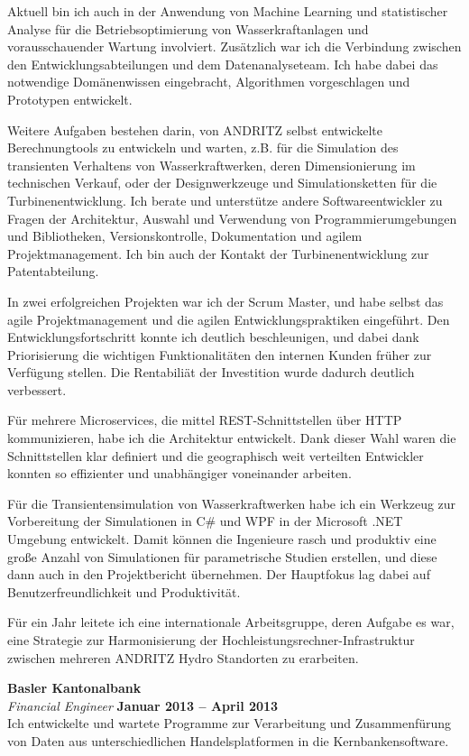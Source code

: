 \documentclass[line,11pt,a4paper]{../resume}
\begin{document}
\begin{resume}
Aktuell bin ich auch in der Anwendung von Machine Learning und statistischer
Analyse für die Betriebsoptimierung von Wasserkraftanlagen und
vorausschauender Wartung involviert. Zusätzlich war ich die Verbindung
zwischen den Entwicklungsabteilungen und dem Datenanalyseteam. Ich habe dabei
das notwendige Domänenwissen eingebracht, Algorithmen vorgeschlagen und
Prototypen entwickelt.

Weitere Aufgaben bestehen darin, von ANDRITZ selbst entwickelte
Berechnungtools zu entwickeln und warten, z.B. für die Simulation des
transienten Verhaltens von Wasserkraftwerken, deren Dimensionierung im
technischen Verkauf, oder der Designwerkzeuge und Simulationsketten für die
Turbinenentwicklung. Ich berate und unterstütze andere Softwareentwickler zu
Fragen der Architektur, Auswahl und Verwendung von Programmierumgebungen und
Bibliotheken, Versionskontrolle, Dokumentation und agilem Projektmanagement.
Ich bin auch der Kontakt der Turbinenentwicklung zur Patentabteilung.

In zwei erfolgreichen Projekten war ich der Scrum Master, und habe selbst das
agile Projektmanagement und die agilen Entwicklungspraktiken eingeführt.
Den Entwicklungsfortschritt konnte ich deutlich beschleunigen, und dabei dank
Priorisierung die wichtigen Funktionalitäten den internen Kunden früher zur
Verfügung stellen. Die Rentabiliät der Investition wurde dadurch deutlich
verbessert.

Für mehrere Microservices, die mittel REST-Schnittstellen über HTTP
kommunizieren, habe ich die Architektur entwickelt. Dank dieser Wahl waren die
Schnittstellen klar definiert und die geographisch weit verteilten Entwickler
konnten so effizienter und unabhängiger voneinander arbeiten.

Für die Transientensimulation von Wasserkraftwerken habe ich ein Werkzeug
zur Vorbereitung der Simulationen in C\# und WPF in der Microsoft .NET
Umgebung entwickelt. Damit können die Ingenieure rasch und produktiv eine
gro{\ss}e Anzahl von Simulationen für parametrische Studien erstellen, und
diese dann auch in den Projektbericht übernehmen. Der Hauptfokus lag dabei
auf Benutzerfreundlichkeit und Produktivität.

Für ein Jahr leitete ich eine internationale Arbeitsgruppe, deren Aufgabe
es war, eine Strategie zur Harmonisierung der
Hochleistungsrechner-Infrastruktur zwischen mehreren ANDRITZ Hydro Standorten
zu erarbeiten.

\textbf{Basler Kantonalbank} \vspace{2mm}\\\vspace{1mm}%
\textsl{Financial Engineer} \hfill \textbf{Januar 2013 -- April 2013}\\
Ich entwickelte und wartete Programme zur Verarbeitung und
Zusammenfürung von Daten aus unterschiedlichen Handelsplatformen in die
Kernbankensoftware.


\end{resume}
\end{document}
